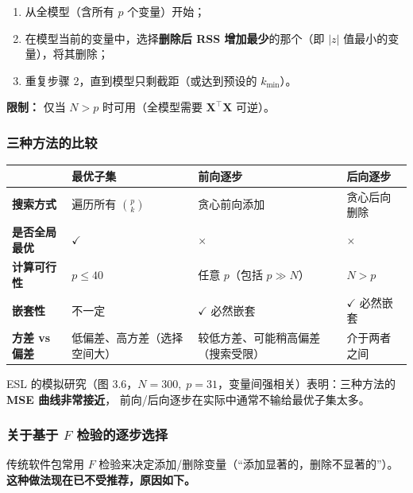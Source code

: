 \begin{enumerate}[label=第 \arabic* 步：, leftmargin=*]
    \item 从全模型（含所有 $p$ 个变量）开始；
    \item 在模型当前的变量中，选择\textbf{删除后 RSS 增加最少}的那个（即 $|z|$ 值最小的变量），将其删除；
    \item 重复步骤 2，直到模型只剩截距（或达到预设的 $k_{\min}$）。
\end{enumerate}

\textbf{限制：} 仅当 $N > p$ 时可用（全模型需要 $\mathbf{X}^\top \mathbf{X}$ 可逆）。

\subsubsection{三种方法的比较}

\begin{center}
\renewcommand{\arraystretch}{1.4}
\begin{tabular}{p{3cm}|p{4.5cm}|p{4.5cm}|p{4.5cm}}
\toprule
& \textbf{最优子集} & \textbf{前向逐步} & \textbf{后向逐步} \\
\midrule
\textbf{搜索方式} & 遍历所有 $\binom{p}{k}$ & 贪心前向添加 & 贪心后向删除 \\
\textbf{是否全局最优} & {\scriptsize $\checkmark$} & {\scriptsize $\times$} & {\scriptsize $\times$} \\
\textbf{计算可行性} & $p \le 40$ & 任意 $p$（包括 $p \gg N$） & $N > p$ \\
\textbf{嵌套性} & 不一定 & {\scriptsize $\checkmark$} 必然嵌套 & {\scriptsize $\checkmark$} 必然嵌套 \\
\textbf{方差 vs 偏差} & 低偏差、高方差（选择空间大） & 较低方差、可能稍高偏差（搜索受限） & 介于两者之间 \\
\bottomrule
\end{tabular}
\end{center}

ESL 的模拟研究（图 3.6，$N=300,\; p=31$，变量间强相关）表明：三种方法的 \textbf{MSE 曲线非常接近}，
前向/后向逐步在实际中通常不输给最优子集太多。

\subsubsection{关于基于 $F$ 检验的逐步选择}

传统软件包常用 $F$ 检验来决定添加/删除变量（``添加显著的，删除不显著的''）。
\textbf{这种做法现在已不受推荐，原因如下。}


